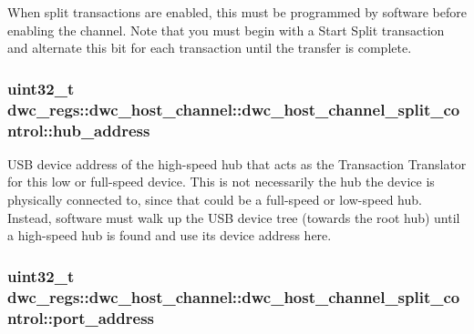 When split transactions are enabled, this must be programmed by software before enabling the channel. Note that you must begin with a Start Split transaction and alternate this bit for each transaction until the transfer is complete. \hypertarget{uniondwc__regs_1_1dwc__host__channel_1_1dwc__host__channel__split__control_a87e4890c48748321e9e34ea409a5c7ed}{
\subsubsection[{hub\-\_\-address}]{\setlength{\rightskip}{0pt plus 5cm}uint32\-\_\-t dwc\-\_\-regs\-::dwc\-\_\-host\-\_\-channel\-::dwc\-\_\-host\-\_\-channel\-\_\-split\-\_\-control\-::hub\-\_\-address}}\label{uniondwc__regs_1_1dwc__host__channel_1_1dwc__host__channel__split__control_a87e4890c48748321e9e34ea409a5c7ed}
U\-S\-B device address of the high-\/speed hub that acts as the Transaction Translator for this low or full-\/speed device. This is not necessarily the hub the device is physically connected to, since that could be a full-\/speed or low-\/speed hub. Instead, software must walk up the U\-S\-B device tree (towards the root hub) until a high-\/speed hub is found and use its device address here. \hypertarget{uniondwc__regs_1_1dwc__host__channel_1_1dwc__host__channel__split__control_ae47484c2e0a2647423136c67059b6df2}{
\subsubsection[{port\-\_\-address}]{\setlength{\rightskip}{0pt plus 5cm}uint32\-\_\-t dwc\-\_\-regs\-::dwc\-\_\-host\-\_\-channel\-::dwc\-\_\-host\-\_\-channel\-\_\-split\-\_\-control\-::port\-\_\-address}}\label{uniondwc__regs_1_1dwc__host__channel_1_1dwc__host__channel__split__control_ae47484c2e0a2647423136c67059b6df2}
